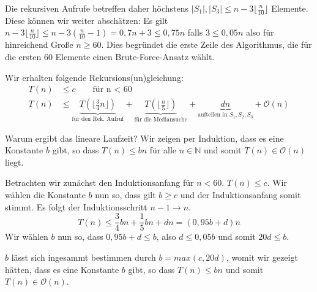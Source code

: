 Die rekursiven Aufrufe betreffen daher höchstens $|S_1|, |S_3| \le n - 3 \lfloor \frac{n}{10} \rfloor$ Elemente. Diese können wir weiter abschätzen: Es gilt $n - 3 \lfloor \frac{n}{10} \rfloor \le n - 3 (\frac{n}{10} - 1) = 0,7 n + 3 \le 0,75 n$ falls $3 \le 0,05 n$ also für hinreichend Große $n \ge 60$. Dies begründet die erste Zeile des Algorithmus, die für die ersten 60 Elemente einen Brute-Force-Ansatz wählt.

Wir erhalten folgende Rekursions(un)gleichung:
\begin{align*}
  T(n) &\le c \qquad\text{für n < 60}\\
  T(n) &\le \underbrace{T(\lfloor\frac{3}{4}n\rfloor)}_{\text{für den Rek. Aufruf}} + \underbrace{T(\lfloor \frac{n}{5} \rfloor)}_{\text{für die Mediansuche}} + \underbrace{dn}_{\text{aufteilen in } S_1, S_2, S_3} + \mathcal{O}(n)
\end{align*}
%

Warum ergibt das lineare Laufzeit? Wir zeigen per Induktion, dass es eine Konstante $b$ gibt, so dass $T(n) \le bn$ für alle $n \in \mathbb{N}$ und somit $T(n) \in \mathcal{O}(n)$ liegt.

Betrachten wir zunächst den Induktionsanfang für $n<60$. $T(n) \le c$. Wir wählen die Konstante $b$ nun so, dass gilt $b \ge c$ und der Induktionsanfang somit stimmt.
Es folgt der Induktionsschritt $n-1 \to n$. 
\[ T(n) \le \frac{3}{4} bn + \frac{1}{5} bn + dn = (0,95 b + d) n \]
Wir wählen $b$ nun so, dass $0,95 b + d \le b$, also $d \le 0,05 b$ und somit $20 d \le b$.

$b$ lässt sich ingesammt bestimmen durch $b = max(c, 20 d)$, womit wir gezeigt hätten, dass es eine Konstante $b$ gibt, so dass $T(n) \le bn$ und somit $T(n) \in \mathcal{O}(n)$.


